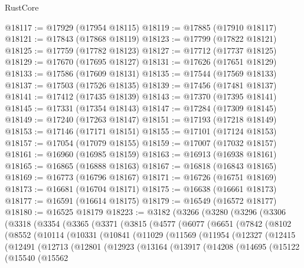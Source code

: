 \begin{lexlean}{RustCore}
\begin{coremodule}
@18117 := @17929 (@17954 @18115)
@18119 := @17885 (@17910 @18117)
@18121 := @17843 (@17868 @18119)
@18123 := @17799 (@17822 @18121)
@18125 := @17759 (@17782 @18123)
@18127 := @17712 (@17737 @18125)
@18129 := @17670 (@17695 @18127)
@18131 := @17626 (@17651 @18129)
@18133 := @17586 (@17609 @18131)
@18135 := @17544 (@17569 @18133)
@18137 := @17503 (@17526 @18135)
@18139 := @17456 (@17481 @18137)
@18141 := @17412 (@17435 @18139)
@18143 := @17370 (@17395 @18141)
@18145 := @17331 (@17354 @18143)
@18147 := @17284 (@17309 @18145)
@18149 := @17240 (@17263 @18147)
@18151 := @17193 (@17218 @18149)
@18153 := @17146 (@17171 @18151)
@18155 := @17101 (@17124 @18153)
@18157 := @17054 (@17079 @18155)
@18159 := @17007 (@17032 @18157)
@18161 := @16960 (@16985 @18159)
@18163 := @16913 (@16938 @18161)
@18165 := @16865 (@16888 @18163)
@18167 := @16818 (@16843 @18165)
@18169 := @16773 (@16796 @18167)
@18171 := @16726 (@16751 @18169)
@18173 := @16681 (@16704 @18171)
@18175 := @16638 (@16661 @18173)
@18177 := @16591 (@16614 @18175)
@18179 := @16549 (@16572 @18177)
@18180 := @16525 @18179
@18223 := @3182
    (@3266
      (@3280
        (@3296
          (@3306
            (@3318
              (@3354
                (@3365
                  (@3371
                    (@3815
                      (@4577
                        (@6077
                          (@6651
                            (@7842
                              (@8102
                                (@8552
                                  (@10114
                                    (@10331
                                      (@10841
                                        (@11029
                                          (@11569
                                            (@11954
                                              (@12327
                                                (@12415
                                                  (@12491
                                                    (@12713
                                                      (@12801
                                                        (@12923
                                                          (@13164
                                                            (@13917
                                                              (@14208
                                                                (@14695
                                                                  (@15122
                                                                    (@15540
                                                                      (@15562

\end{coremodule}
\end{lexlean}
